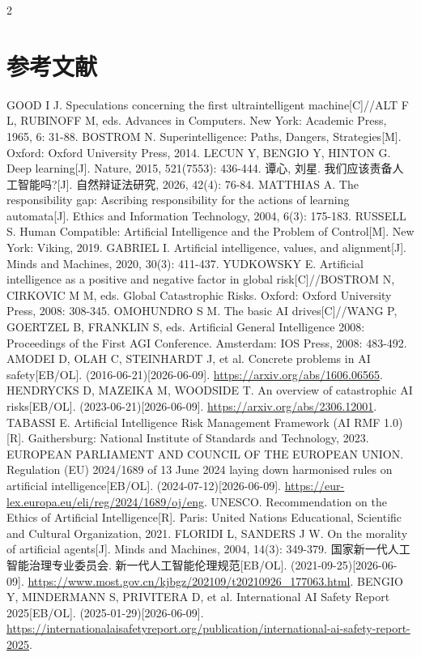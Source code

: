 \documentclass[a4paper,UTF8,zihao=5,twoside]{ctexart}
\makeatletter
\renewenvironment{thebibliography}[1]
  {\section*{\centering\heiti\zihao{5}参考文献}
   \zihao{6}\songti
   \list{\@biblabel{\@arabic\c@enumiv}}
        {\settowidth\labelwidth{\@biblabel{#1}}
         \leftmargin\labelwidth
         \advance\leftmargin\labelsep
         \setlength{\itemsep}{0pt}
         \setlength{\parsep}{0pt}
         \setlength{\topsep}{0.3em}
         \usecounter{enumiv}
         \let\p@enumiv\@empty
         \renewcommand\theenumiv{\@arabic\c@enumiv}}
   \sloppy\clubpenalty4000\widowpenalty4000}
  {\def\@noitemerr{\@latex@warning{Empty `thebibliography' environment}}\endlist}
\makeatother
\begin{document}
\begin{multicols}{2}
\begin{thebibliography}{99}
 GOOD I J. Speculations concerning the first ultraintelligent machine[C]//ALT F L, RUBINOFF M, eds. Advances in Computers. New York: Academic Press, 1965, 6: 31-88.
 BOSTROM N. Superintelligence: Paths, Dangers, Strategies[M]. Oxford: Oxford University Press, 2014.
 LECUN Y, BENGIO Y, HINTON G. Deep learning[J]. Nature, 2015, 521(7553): 436-444.
 谭心, 刘星. 我们应该责备人工智能吗?[J]. 自然辩证法研究, 2026, 42(4): 76-84.
 MATTHIAS A. The responsibility gap: Ascribing responsibility for the actions of learning automata[J]. Ethics and Information Technology, 2004, 6(3): 175-183.
 RUSSELL S. Human Compatible: Artificial Intelligence and the Problem of Control[M]. New York: Viking, 2019.
 GABRIEL I. Artificial intelligence, values, and alignment[J]. Minds and Machines, 2020, 30(3): 411-437.
 YUDKOWSKY E. Artificial intelligence as a positive and negative factor in global risk[C]//BOSTROM N, CIRKOVIC M M, eds. Global Catastrophic Risks. Oxford: Oxford University Press, 2008: 308-345.
 OMOHUNDRO S M. The basic AI drives[C]//WANG P, GOERTZEL B, FRANKLIN S, eds. Artificial General Intelligence 2008: Proceedings of the First AGI Conference. Amsterdam: IOS Press, 2008: 483-492.
 AMODEI D, OLAH C, STEINHARDT J, et al. Concrete problems in AI safety[EB/OL]. (2016-06-21)[2026-06-09]. \url{https://arxiv.org/abs/1606.06565}.
 HENDRYCKS D, MAZEIKA M, WOODSIDE T. An overview of catastrophic AI risks[EB/OL]. (2023-06-21)[2026-06-09]. \url{https://arxiv.org/abs/2306.12001}.
 TABASSI E. Artificial Intelligence Risk Management Framework (AI RMF 1.0)[R]. Gaithersburg: National Institute of Standards and Technology, 2023.
 EUROPEAN PARLIAMENT AND COUNCIL OF THE EUROPEAN UNION. Regulation (EU) 2024/1689 of 13 June 2024 laying down harmonised rules on artificial intelligence[EB/OL]. (2024-07-12)[2026-06-09]. \url{https://eur-lex.europa.eu/eli/reg/2024/1689/oj/eng}.
 UNESCO. Recommendation on the Ethics of Artificial Intelligence[R]. Paris: United Nations Educational, Scientific and Cultural Organization, 2021.
 FLORIDI L, SANDERS J W. On the morality of artificial agents[J]. Minds and Machines, 2004, 14(3): 349-379.
 国家新一代人工智能治理专业委员会. 新一代人工智能伦理规范[EB/OL]. (2021-09-25)[2026-06-09]. \url{https://www.most.gov.cn/kjbgz/202109/t20210926_177063.html}.
 BENGIO Y, MINDERMANN S, PRIVITERA D, et al. International AI Safety Report 2025[EB/OL]. (2025-01-29)[2026-06-09]. \url{https://internationalaisafetyreport.org/publication/international-ai-safety-report-2025}.
\end{thebibliography}

\end{multicols}
\end{document}
